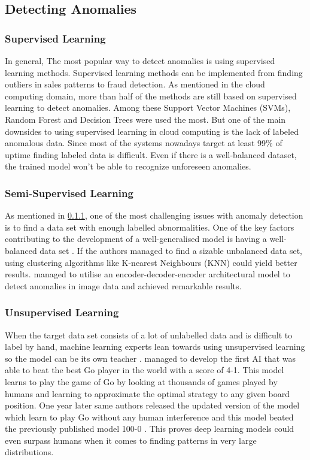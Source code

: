 \subsection{Detecting Anomalies}

\subsubsection{Supervised Learning}\label{sec:approch-supervised}
In general, The most popular way to detect anomalies is using supervised learning methods. Supervised learning methods can be implemented from finding outliers in sales patterns to fraud detection. \cite{du2018anomaly} As mentioned in the cloud computing domain, more than half of the methods are still based on supervised learning to detect anomalies. Among these Support Vector Machines (SVMs), Random Forest and Decision Trees were used the most. But one of the main downsides to using supervised learning in cloud computing is the lack of labeled anomalous data. Since most of the systems nowadays target at least 99\% of uptime finding labeled data is difficult. Even if there is a well-balanced dataset, the trained model won't be able to recognize unforeseen anomalies.

\subsubsection{Semi-Supervised Learning}

As mentioned in \ref{sec:approch-supervised}, one of the most challenging issues with anomaly detection is to find a data set with enough labelled abnormalities. One of the key factors contributing to the development of a well-generalised model is having a well-balanced data set \citep{batista2004study}. If the authors managed to find a sizable unbalanced data set, using clustering algorithms like K-nearest Neighbours (KNN) could yield better results. \cite{akcay2018ganomaly} managed to utilise an encoder-decoder-encoder architectural model to detect anomalies in image data and achieved remarkable results. 

\subsubsection{Unsupervised Learning}

When the target data set consists of a lot of unlabelled data and is difficult to label by hand, machine learning experts lean towards using unsupervised learning so the model can be its own teacher \citep{Unsuperv29:online}. \cite{silver2016mastering} managed to develop the first AI that was able to beat the best Go player in the world with a score of 4-1. This model learns to play the game of Go by looking at thousands of games played by humans and learning to approximate the optimal strategy to any given board position. One year later same authors released the updated version of the model which learn to play Go without any human interference and this model beated the previously published model 100-0 \citep{silver2017mastering}. This proves deep learning models could even surpass humans when it comes to finding patterns in very large distributions. 

